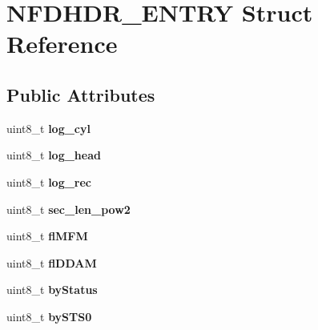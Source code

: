 \hypertarget{structNFDHDR__ENTRY}{\section{N\-F\-D\-H\-D\-R\-\_\-\-E\-N\-T\-R\-Y Struct Reference}
\label{structNFDHDR__ENTRY}
}
\subsection*{Public Attributes}
\begin{DoxyCompactItemize}
\item 
\hypertarget{structNFDHDR__ENTRY_ae8523f97410fceb29ed1e9e77da734fe}{uint8\-\_\-t {\bfseries log\-\_\-cyl}}\label{structNFDHDR__ENTRY_ae8523f97410fceb29ed1e9e77da734fe}

\item 
\hypertarget{structNFDHDR__ENTRY_a645482a87d18d9608411a31d1be81563}{uint8\-\_\-t {\bfseries log\-\_\-head}}\label{structNFDHDR__ENTRY_a645482a87d18d9608411a31d1be81563}

\item 
\hypertarget{structNFDHDR__ENTRY_a9dda4fb9e8157f373ccadc7477f943e1}{uint8\-\_\-t {\bfseries log\-\_\-rec}}\label{structNFDHDR__ENTRY_a9dda4fb9e8157f373ccadc7477f943e1}

\item 
\hypertarget{structNFDHDR__ENTRY_af8e66d7a81c5d458586ad0d4641ab21e}{uint8\-\_\-t {\bfseries sec\-\_\-len\-\_\-pow2}}\label{structNFDHDR__ENTRY_af8e66d7a81c5d458586ad0d4641ab21e}

\item 
\hypertarget{structNFDHDR__ENTRY_af396bef8b6af9984363d7b9cdcb605a8}{uint8\-\_\-t {\bfseries fl\-M\-F\-M}}\label{structNFDHDR__ENTRY_af396bef8b6af9984363d7b9cdcb605a8}

\item 
\hypertarget{structNFDHDR__ENTRY_a4761907057a0be91a0081b78452b4a20}{uint8\-\_\-t {\bfseries fl\-D\-D\-A\-M}}\label{structNFDHDR__ENTRY_a4761907057a0be91a0081b78452b4a20}

\item 
\hypertarget{structNFDHDR__ENTRY_a238981f07a21eb7b5b7ed0f6ce3d5d78}{uint8\-\_\-t {\bfseries by\-Status}}\label{structNFDHDR__ENTRY_a238981f07a21eb7b5b7ed0f6ce3d5d78}

\item 
\hypertarget{structNFDHDR__ENTRY_a3d0a97e177e64c93b63d71021a49f3c4}{uint8\-\_\-t {\bfseries by\-S\-T\-S0}}\label{structNFDHDR__ENTRY_a3d0a97e177e64c93b63d71021a49f3c4}


\end{DoxyCompactItemize}
